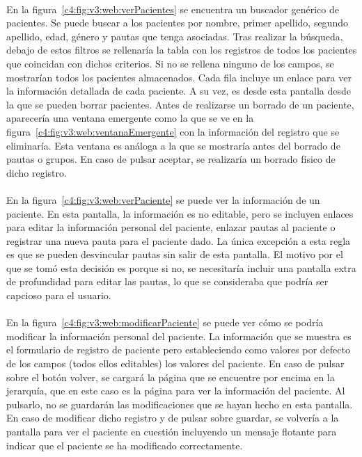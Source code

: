 \paragraph{}
En la figura~\ref{c4:fig:v3:web:verPacientes} se encuentra un buscador genérico de pacientes. Se puede buscar a los pacientes por nombre, primer apellido, segundo apellido, edad, género y pautas que tenga asociadas. Tras realizar la búsqueda, debajo de estos filtros se rellenaría la tabla con los registros de todos los pacientes que coincidan con dichos criterios. Si no se rellena ninguno de los campos, se mostrarían todos los pacientes almacenados. Cada fila incluye un enlace para ver la información detallada de cada paciente. A su vez, es desde esta pantalla desde la que se pueden borrar pacientes. Antes de realizarse un borrado de un paciente, aparecería una ventana emergente como la que se ve en la figura~\ref{c4:fig:v3:web:ventanaEmergente} con la información del registro que se eliminaría. Esta ventana es análoga a la que se mostraría antes del borrado de pautas o grupos. En caso de pulsar aceptar, se realizaría un borrado físico de dicho registro.

\paragraph{}
En la figura~\ref{c4:fig:v3:web:verPaciente} se puede ver la información de un paciente. En esta pantalla, la información es no editable, pero se incluyen enlaces para editar la información personal del paciente, enlazar pautas al paciente o registrar una nueva pauta para el paciente dado. La única excepción a esta regla es que se pueden desvincular pautas sin salir de esta pantalla. El motivo por el que se tomó esta decisión es porque si no, se necesitaría incluir una pantalla extra de profundidad para editar las pautas, lo que se consideraba que podría ser capcioso para el usuario.

\paragraph{}
En la figura~\ref{c4:fig:v3:web:modificarPaciente} se puede ver cómo se podría modificar la información personal del paciente. La información que se muestra es el formulario de registro de paciente pero estableciendo como valores por defecto de los campos (todos ellos editables) los valores del paciente. En caso de pulsar sobre el botón volver, se cargará la página que se encuentre por encima en la jerarquía, que en este caso es la página para ver la información del paciente. Al pulsarlo, no se guardarán las modificaciones que se hayan hecho en esta pantalla. En caso de modificar dicho registro y de pulsar sobre guardar, se volvería a la pantalla para ver el paciente en cuestión incluyendo un mensaje flotante para indicar que el paciente se ha modificado correctamente.

